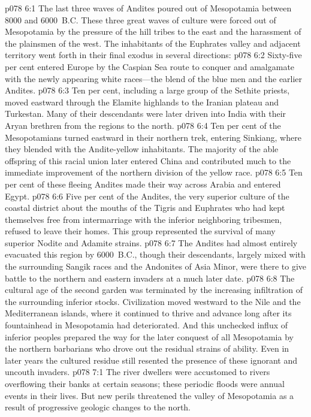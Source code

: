 \vs p078 6:1 The last three waves of Andites poured out of Mesopotamia between 8000 and 6000~B.C. These three great waves of culture were forced out of Mesopotamia by the pressure of the hill tribes to the east and the harassment of the plainsmen of the west. The inhabitants of the Euphrates valley and adjacent territory went forth in their final exodus in several directions:
\vs p078 6:2 Sixty\hyp{}five per cent entered Europe by the Caspian Sea route to conquer and amalgamate with the newly appearing white races---the blend of the blue men and the earlier Andites.
\vs p078 6:3 Ten per cent, including a large group of the Sethite priests, moved eastward through the Elamite highlands to the Iranian plateau and Turkestan. Many of their descendants were later driven into India with their Aryan brethren from the regions to the north.
\vs p078 6:4 Ten per cent of the Mesopotamians turned eastward in their northern trek, entering Sinkiang, where they blended with the Andite\hyp{}yellow inhabitants. The majority of the able offspring of this racial union later entered China and contributed much to the immediate improvement of the northern division of the yellow race.
\vs p078 6:5 Ten per cent of these fleeing Andites made their way across Arabia and entered Egypt.
\pc \vs p078 6:6 Five per cent of the Andites, the very superior culture of the coastal district about the mouths of the Tigris and Euphrates who had kept themselves free from intermarriage with the inferior neighboring tribesmen, refused to leave their homes. This group represented the survival of many superior Nodite and Adamite strains.
\pc \vs p078 6:7 The Andites had almost entirely evacuated this region by 6000~B.C., though their descendants, largely mixed with the surrounding Sangik races and the Andonites of Asia Minor, were there to give battle to the northern and eastern invaders at a much later date.\plusone
\vs p078 6:8 The cultural age of the second garden was terminated by the increasing infiltration of the surrounding inferior stocks. Civilization moved westward to the Nile and the Mediterranean islands, where it continued to thrive and advance long after its fountainhead in Mesopotamia had deteriorated. And this unchecked influx of inferior peoples prepared the way for the later conquest of all Mesopotamia by the northern barbarians who drove out the residual strains of ability. Even in later years the cultured residue still resented the presence of these ignorant and uncouth invaders.
\vs p078 7:1 The river dwellers were accustomed to rivers overflowing their banks at certain seasons; these periodic floods were annual events in their lives. But new perils threatened the valley of Mesopotamia as a result of progressive geologic changes to the north.
